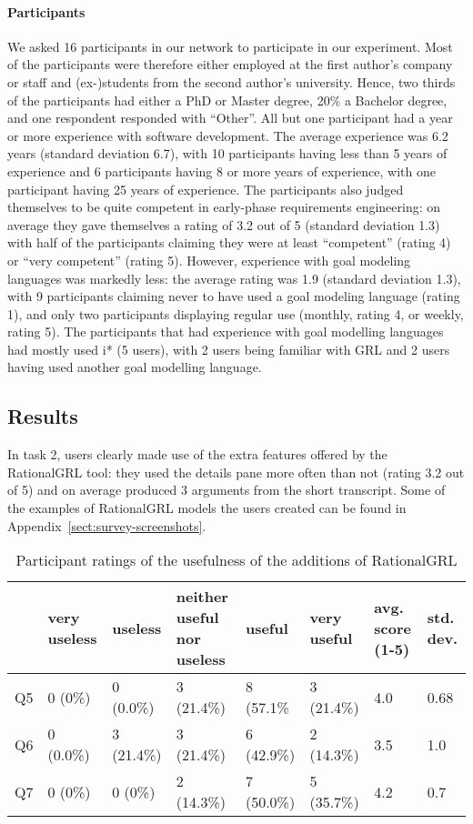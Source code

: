 {\paragraph{Participants}
We asked 16 participants in our network to participate in our experiment. Most of the participants were therefore either employed at the first author's company or staff and (ex-)students from the second author's university. Hence, two thirds of the participants had either a PhD or Master degree, 20\% a Bachelor degree, and one respondent responded with ``Other''. All but one participant had a year or more experience with software development. The average experience was 6.2 years (standard deviation 6.7), with 10 participants having less than 5 years of experience and 6 participants having 8 or more years of experience, with one participant having 25 years of experience. The participants also judged themselves to be quite competent in  early-phase requirements engineering: on average they gave themselves a rating of 3.2 out of 5 (standard deviation 1.3) with half of the participants claiming they were at least ``competent'' (rating 4) or ``very competent'' (rating 5). However, experience with goal modeling languages was markedly less: the average rating was 1.9 (standard deviation 1.3), with 9 participants claiming never to have used a goal modeling language (rating 1), and only two participants displaying regular use (monthly, rating 4, or weekly, rating 5). The participants that had experience with goal modelling languages had mostly used i* (5 users), with 2 users being familiar with GRL and 2 users having used another goal modelling language.

\subsection{Results}

In task 2, users clearly made use of the extra features offered by the RationalGRL tool: they used the details pane more often than not (rating 3.2 out of 5) and on average produced 3 arguments from the short transcript. Some of the examples of RationalGRL models the users created can be found in Appendix~\ref{sect:survey-screenshots}.

\begin{table*}[t]
\centering
\begin{tabularx}{0.95\textwidth}{l|l|l|l|l|l|l|l}
& very useless & useless & neither useful nor useless & useful & very useful & avg. score (1-5) & std. dev.\\
\hline
Q5 & 0 (0\%) & 0 (0.0\%) & 3 (21.4\%) & 8 (57.1\% & 3 (21.4\%) & 4.0 & 0.68\\
Q6 & 0 (0.0\%) & 3 (21.4\%) & 3 (21.4\%) & 6 (42.9\%) & 2 (14.3\%) & 3.5 & 1.0\\
Q7 & 0 (0\%) & 0 (0\%) & 2 (14.3\%) & 7 (50.0\%) & 5 (35.7\%) & 4.2 & 0.7
\end{tabularx}
\caption{Participant ratings of the usefulness of the additions of RationalGRL}
\label{table:survey:table2}
\end{table*}

}
